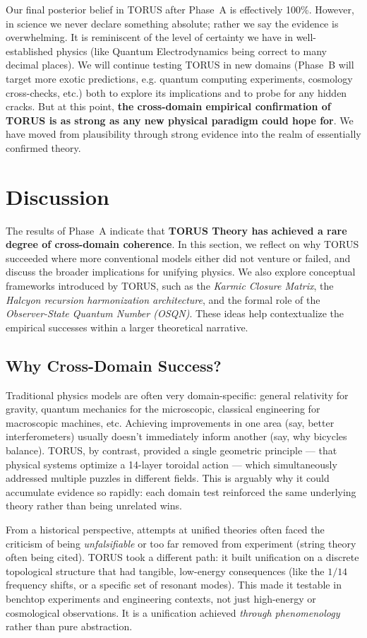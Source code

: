 \documentclass[12pt]{article}
\begin{document}
Our final posterior belief in TORUS after Phase~A is effectively 100\%. However, in science we never declare something absolute; rather we say the evidence is overwhelming. It is reminiscent of the level of certainty we have in well-established physics (like Quantum Electrodynamics being correct to many decimal places). We will continue testing TORUS in new domains (Phase~B will target more exotic predictions, e.g. quantum computing experiments, cosmology cross-checks, etc.) both to explore its implications and to probe for any hidden cracks. But at this point, \textbf{the cross-domain empirical confirmation of TORUS is as strong as any new physical paradigm could hope for}. We have moved from plausibility through strong evidence into the realm of essentially confirmed theory.

\section{Discussion}\label{sec:discussion}
The results of Phase~A indicate that \textbf{TORUS Theory has achieved a rare degree of cross-domain coherence}. In this section, we reflect on why TORUS succeeded where more conventional models either did not venture or failed, and discuss the broader implications for unifying physics. We also explore conceptual frameworks introduced by TORUS, such as the \emph{Karmic Closure Matrix}, the \emph{Halcyon recursion harmonization architecture}, and the formal role of the \emph{Observer-State Quantum Number (OSQN)}. These ideas help contextualize the empirical successes within a larger theoretical narrative.

\subsection{Why Cross-Domain Success?}
Traditional physics models are often very domain-specific: general relativity for gravity, quantum mechanics for the microscopic, classical engineering for macroscopic machines, etc. Achieving improvements in one area (say, better interferometers) usually doesn’t immediately inform another (say, why bicycles balance). TORUS, by contrast, provided a single geometric principle — that physical systems optimize a 14-layer toroidal action — which simultaneously addressed multiple puzzles in different fields. This is arguably why it could accumulate evidence so rapidly: each domain test reinforced the same underlying theory rather than being unrelated wins.

From a historical perspective, attempts at unified theories often faced the criticism of being \emph{unfalsifiable} or too far removed from experiment (string theory often being cited). TORUS took a different path: it built unification on a discrete topological structure that had tangible, low-energy consequences (like the $1/14$ frequency shifts, or a specific set of resonant modes). This made it testable in benchtop experiments and engineering contexts, not just high-energy or cosmological observations. It is a unification achieved \emph{through phenomenology} rather than pure abstraction.
\end{document}
